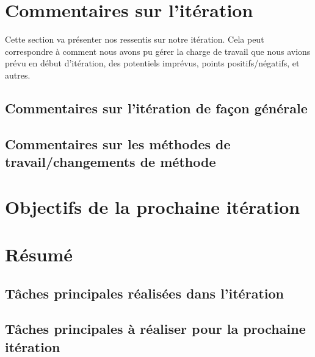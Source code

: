 \documentclass[12pt,titlepage,french]{article}
\begin{document}
\section{Commentaires sur l'itération}

Cette section va présenter nos ressentis sur notre itération. Cela peut correspondre à comment nous avons pu gérer la charge de travail que nous avions prévu en début d'itération, des potentiels imprévus, points positifs/négatifs, et autres.

\subsection{Commentaires sur l'itération de façon générale}



\subsection{Commentaires sur les méthodes de travail/changements de méthode}


\section{Objectifs de la prochaine itération}




\section{Résumé}
\subsection{Tâches principales réalisées dans l'itération}

\subsection{Tâches principales à réaliser pour la prochaine itération}

\begin{thebibliography}{3}


\end{thebibliography}
\end{document}
